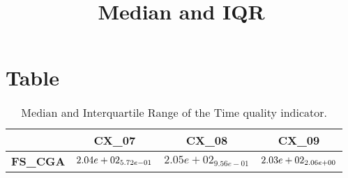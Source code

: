 \documentclass{article}
\title{Median and IQR}
\author{}
\begin{document}
\maketitle
\section{Table}
\begin{table}[!htp]
  \caption{Median and Interquartile Range of the Time quality indicator.}
  \label{table:Time}
  \centering
  \begin{scriptsize}
  \begin{tabular}{c|ccc}
      & \textbf{CX\_07} & \textbf{CX\_08} & \textbf{CX\_09} \\\hline
      \textbf{FS_CGA} & $\cellcolor{gray95} 2.04e+02_{5.72e-01} $ & $ 2.05e+02_{9.56e-01} $ & $ \cellcolor{gray25} 2.03e+02_{2.06e+00}$ \\
  \end{tabular}
  \end{scriptsize}
\end{table}
\end{document}
